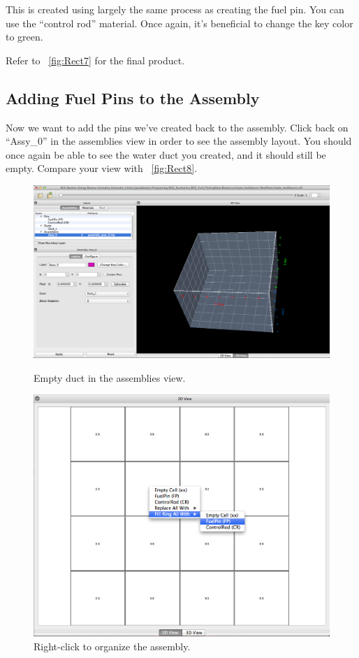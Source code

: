 This is created using largely the same process as creating the fuel pin.  You can use the ``control rod'' material.  Once again, it's beneficial to change the key color to green.

Refer to ~\ref{fig:Rect7} for the final product.
\clearpage
\subsection{Adding Fuel Pins to the Assembly}

Now we want to add the pins we've created back to the assembly.  Click back on ``Assy\_0'' in the assemblies view in order to see the assembly layout.  You should once again be able to see the water duct you created, and it should still be empty.  Compare your view with ~\ref{fig:Rect8}.

\begin{figure}
\centering
\begin{minipage}{.5\textwidth}
  \centering
  \includegraphics[width=0.8\linewidth]{Images/rect-empty-assy.png}
\caption{Empty duct in the assemblies view.}
\label{fig:Rect8}
\end{minipage}%
\begin{minipage}{.5\textwidth}
  \centering
 \includegraphics[width=0.8\linewidth]{Images/rect-assign-pin.png}
\caption{Right-click to organize the assembly.}
\label{fig:Rect9}
\end{minipage}
\end{figure}

